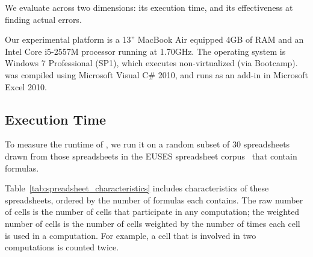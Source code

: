 We evaluate \checkcell{} across two dimensions: its execution time,
and its effectiveness at finding actual errors.

Our experimental platform is a 13'' MacBook Air equipped 4GB of RAM
and an Intel Core i5-2557M processor running at 1.70GHz. The operating
system is Windows 7 Professional (SP1), which executes non-virtualized
(via Bootcamp). \checkcell{} was compiled using Microsoft Visual C\#
2010, and runs as an add-in in Microsoft Excel 2010.

\subsection{Execution Time}
\label{sec:execution_time}

To measure the runtime of \checkcell{}, we run it on a random subset
of 30 spreadsheets drawn from those spreadsheets in the EUSES
spreadsheet corpus~\cite{Fisher:2005:ESC:1082983.1083242} that contain
formulas.

Table~\ref{tab:spreadsheet_characteristics} includes
characteristics of these spreadsheets, ordered by the number of
formulas each contains. The raw number of cells is the number of cells
that participate in any computation; the weighted number of cells is
the number of cells weighted by the number of times each cell is used
in a computation. For example, a cell that is involved in two
computations is counted twice.


